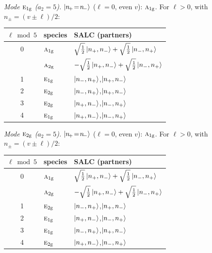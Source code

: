 \documentclass[11pt]{article}
\newcommand{\irr}[1]{\text{\normalfont\scshape #1}}
\newcommand{\ptag}[1]{\mathrm{#1}}
\begin{document}
\emph{Mode $\irr{e}_{1\ptag{g}}$ ($a_2=5$).} $\ket{n_{\!+}\!=\!n_{\!-}}$ ($\ell=0$, even $v$): $\irr{a}_{1\ptag{g}}$. For $\ell>0$, with $n_\pm=(v\pm\ell)/2$:
\begin{longtable}{c l l}\hline $\ell\bmod 5$ & species & SALC (partners)\\ \hline\endhead
0 & $\irr{a}_{1\ptag{g}}$ & $\sqrt{\tfrac{1}{2}}\ket{n_+,n_-}+\sqrt{\tfrac{1}{2}}\ket{n_-,n_+}$\\
 & $\irr{a}_{2\ptag{g}}$ & $-\sqrt{\tfrac{1}{2}}\ket{n_+,n_-}+\sqrt{\tfrac{1}{2}}\ket{n_-,n_+}$\\
1 & $\irr{e}_{1\ptag{g}}$ & $\ket{n_-,n_+}$,\quad $\ket{n_+,n_-}$\\
2 & $\irr{e}_{2\ptag{g}}$ & $\ket{n_-,n_+}$,\quad $\ket{n_+,n_-}$\\
3 & $\irr{e}_{2\ptag{g}}$ & $\ket{n_+,n_-}$,\quad $\ket{n_-,n_+}$\\
4 & $\irr{e}_{1\ptag{g}}$ & $\ket{n_+,n_-}$,\quad $\ket{n_-,n_+}$\\
\hline\end{longtable}

\emph{Mode $\irr{e}_{2\ptag{g}}$ ($a_2=5$).} $\ket{n_{\!+}\!=\!n_{\!-}}$ ($\ell=0$, even $v$): $\irr{a}_{1\ptag{g}}$. For $\ell>0$, with $n_\pm=(v\pm\ell)/2$:
\begin{longtable}{c l l}\hline $\ell\bmod 5$ & species & SALC (partners)\\ \hline\endhead
0 & $\irr{a}_{1\ptag{g}}$ & $\sqrt{\tfrac{1}{2}}\ket{n_+,n_-}+\sqrt{\tfrac{1}{2}}\ket{n_-,n_+}$\\
 & $\irr{a}_{2\ptag{g}}$ & $-\sqrt{\tfrac{1}{2}}\ket{n_+,n_-}+\sqrt{\tfrac{1}{2}}\ket{n_-,n_+}$\\
1 & $\irr{e}_{2\ptag{g}}$ & $\ket{n_-,n_+}$,\quad $\ket{n_+,n_-}$\\
2 & $\irr{e}_{1\ptag{g}}$ & $\ket{n_+,n_-}$,\quad $\ket{n_-,n_+}$\\
3 & $\irr{e}_{1\ptag{g}}$ & $\ket{n_-,n_+}$,\quad $\ket{n_+,n_-}$\\
4 & $\irr{e}_{2\ptag{g}}$ & $\ket{n_+,n_-}$,\quad $\ket{n_-,n_+}$\\
\hline\end{longtable}
\end{document}
